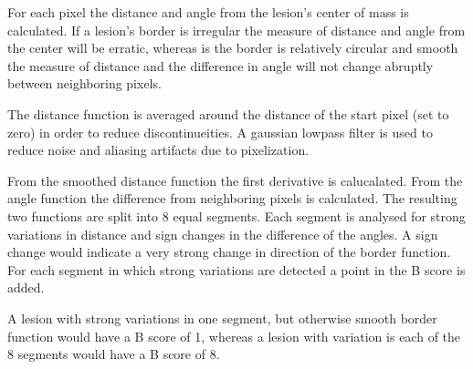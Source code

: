 For each pixel the distance and angle from the lesion's center of mass is calculated. If a lesion's border is irregular the measure of distance and angle from the center will be erratic, whereas is the border is relatively circular and smooth the measure of distance and the difference in angle will not change abruptly between neighboring pixels.

The distance function is averaged around the distance of the start pixel (set to zero) in order to reduce discontinueities. A gaussian lowpass filter is used to reduce noise and aliasing artifacts due to pixelization.

From the smoothed distance function the first derivative is calucalated. From the angle function the difference from neighboring pixels is calculated. The resulting two functions are split into 8 equal segments. Each segment is analysed for strong variations in distance and sign changes in the difference of the angles. A sign change would indicate a very strong change in direction of the border function. For each segment in which strong variations are detected a point in the B score is added.

A lesion with strong variations in one segment, but otherwise smooth border function would have a B score of 1, whereas a lesion with variation is each of the 8 segments would have a B score of 8.

